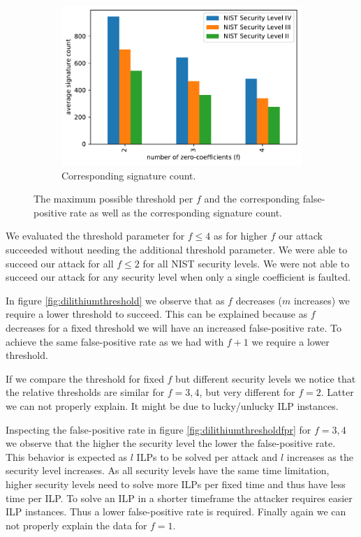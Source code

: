\documentclass[a4paper,titlepage]{article}
\begin{document}
\begin{figure}
	\begin{subfigure}{.5\textwidth}%
		\centering%
		\includegraphics[width=.95\linewidth]{plots/dilithium_threshold_sigcount}%
		\caption{Corresponding signature count.}%
		\label{fig:dilithiumthresholdsigcount}%
	\end{subfigure}%
%
	\caption{The maximum possible threshold per $f$ and the corresponding false-positive rate as well as the corresponding signature count.}
	\label{fig:dilithiumthresholdall}%
\end{figure}
We evaluated the threshold parameter for $f \leq 4$ as for higher $f$ our attack succeeded without needing the additional threshold parameter.
We were able to succeed our attack for all $f \leq 2$ for all NIST security levels. We were not able to succeed our attack for any security level when only a single coefficient is faulted.

In figure \ref{fig:dilithiumthreshold} we observe that as $f$ decreases ($m$ increases) we require a lower threshold to succeed. This can be explained because as $f$ decreases for a fixed threshold we will have an increased false-positive rate. To achieve the same false-positive rate as we had with $f + 1$ we require a lower threshold. 

If we compare the  threshold for fixed $f$ but different security levels we notice that the relative thresholds are similar for $f = 3, 4$, but very different for $f = 2$. Latter we can not properly explain. It might be due to lucky/unlucky ILP instances.

Inspecting the false-positive rate in figure \ref{fig:dilithiumthresholdfpr} for $f=3, 4$ we observe that the higher the security level the lower the false-positive rate. This behavior is expected as $l$ ILPs to be solved per attack and $l$ increases as the security level increases. As all security levels have the same time limitation, higher security levels need to solve more ILPs per fixed time and thus have less time per ILP. To solve an ILP in a shorter timeframe the attacker requires easier ILP instances. Thus a lower false-positive rate is required. Finally again we can not properly explain the data for $f=1$.
\end{document}

